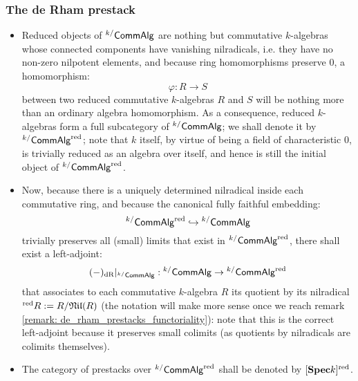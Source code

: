             \subsubsection{The de Rham prestack}
                \begin{remark} \label{remark: reduced_affine_schemes}
                    \noindent
                    \begin{itemize}
                        \item Reduced objects of ${}^{k/}\mathsf{Comm}\mathsf{Alg}$ are nothing but commutative $k$-algebras whose connected components have vanishing nilradicals, i.e. they have no non-zero nilpotent elements, and because ring homomorphisms preserve $0$, a homomorphism:
                            $$\varphi: R \to S$$
                        between two reduced commutative $k$-algebras $R$ and $S$ will be nothing more than an ordinary algebra homomorphism. As a consequence, reduced $k$-algebras form a full subcategory of ${}^{k/}\mathsf{Comm}\mathsf{Alg}$; we shall denote it by ${}^{k/}\mathsf{Comm}\mathsf{Alg}^{\mathrm{red}}$; note that $k$ itself, by virtue of being a field of characteristic $0$, is trivially reduced as an algebra over itself, and hence is still the initial object of ${}^{k/}\mathsf{Comm}\mathsf{Alg}^{\mathrm{red}}$. 
                        \item Now, because there is a uniquely determined nilradical inside each commutative ring, and because the canonical fully faithful embedding:
                            $${}^{k/}\mathsf{Comm}\mathsf{Alg}^{\mathrm{red}} \hookrightarrow {}^{k/}\mathsf{Comm}\mathsf{Alg}$$
                        trivially preserves all (small) limits that exist in ${}^{k/}\mathsf{Comm}\mathsf{Alg}^{\mathrm{red}}$, there shall exist a left-adjoint:
                            $$(-)_{\mathrm{dR}}|_{{}^{k/}\mathsf{Comm}\mathsf{Alg}}: {}^{k/}\mathsf{Comm}\mathsf{Alg} \to {}^{k/}\mathsf{Comm}\mathsf{Alg}^{\mathrm{red}}$$
                        that associates to each commutative $k$-algebra $R$ its quotient by its nilradical ${}^{\mathrm{red}}R := R/\mathfrak{Nil}(R)$ (the notation will make more sense once we reach remark \ref{remark: de_rham_prestacks_functoriality}): note that this is the correct left-adjoint because it preserves small colimits (as quotients by nilradicals are colimits themselves). 
                        \item The category of prestacks over ${}^{k/}\mathsf{Comm}\mathsf{Alg}^{\mathrm{red}}$ shall be denoted by $[\mathbf{Spec} k]^{\mathrm{red}}$. 
                    \end{itemize}
                \end{remark}
            
